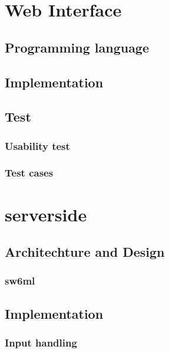   \section{Web Interface}
    \label{sect:webInterface}
      \subsection{Programming language}
        
      \subsection{Implementation}
        
      \subsection{Test}
      \subsubsection{Usability test}
        
      \subsubsection{Test cases}
        

  \section{serverside} %
    
    \subsection{Architechture and Design}
      \label{sect:ssArchAndDesign}
	
      \subsubsection{sw6ml} %
	\label{sw6ml}
        
	  
    \subsection{Implementation}
      \subsubsection{Input handling} %
	
